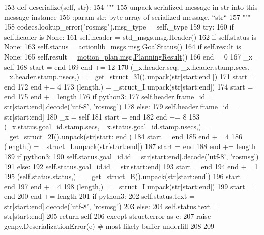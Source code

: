 \begin{DoxyCode}
153   \textcolor{keyword}{def }deserialize(self, str):
154     \textcolor{stringliteral}{"""}
155 \textcolor{stringliteral}{    unpack serialized message in str into this message instance}
156 \textcolor{stringliteral}{    :param str: byte array of serialized message, ``str``}
157 \textcolor{stringliteral}{    """}
158     codecs.lookup\_error(\textcolor{stringliteral}{"rosmsg"}).msg\_type = self.\_type
159     \textcolor{keywordflow}{try}:
160       \textcolor{keywordflow}{if} self.header \textcolor{keywordflow}{is} \textcolor{keywordtype}{None}:
161         self.header = std\_msgs.msg.Header()
162       \textcolor{keywordflow}{if} self.status \textcolor{keywordflow}{is} \textcolor{keywordtype}{None}:
163         self.status = actionlib\_msgs.msg.GoalStatus()
164       \textcolor{keywordflow}{if} self.result \textcolor{keywordflow}{is} \textcolor{keywordtype}{None}:
165         self.result = \hyperlink{classmotion__plan_1_1msg_1_1__PlanningResult_1_1PlanningResult}{motion\_plan.msg.PlanningResult}()
166       end = 0
167       \_x = self
168       start = end
169       end += 12
170       (\_x.header.seq, \_x.header.stamp.secs, \_x.header.stamp.nsecs,) = \_get\_struct\_3I().unpack(str[start:end
      ])
171       start = end
172       end += 4
173       (length,) = \_struct\_I.unpack(str[start:end])
174       start = end
175       end += length
176       \textcolor{keywordflow}{if} python3:
177         self.header.frame\_id = str[start:end].decode(\textcolor{stringliteral}{'utf-8'}, \textcolor{stringliteral}{'rosmsg'})
178       \textcolor{keywordflow}{else}:
179         self.header.frame\_id = str[start:end]
180       \_x = self
181       start = end
182       end += 8
183       (\_x.status.goal\_id.stamp.secs, \_x.status.goal\_id.stamp.nsecs,) = \_get\_struct\_2I().unpack(str[start:
      end])
184       start = end
185       end += 4
186       (length,) = \_struct\_I.unpack(str[start:end])
187       start = end
188       end += length
189       \textcolor{keywordflow}{if} python3:
190         self.status.goal\_id.id = str[start:end].decode(\textcolor{stringliteral}{'utf-8'}, \textcolor{stringliteral}{'rosmsg'})
191       \textcolor{keywordflow}{else}:
192         self.status.goal\_id.id = str[start:end]
193       start = end
194       end += 1
195       (self.status.status,) = \_get\_struct\_B().unpack(str[start:end])
196       start = end
197       end += 4
198       (length,) = \_struct\_I.unpack(str[start:end])
199       start = end
200       end += length
201       \textcolor{keywordflow}{if} python3:
202         self.status.text = str[start:end].decode(\textcolor{stringliteral}{'utf-8'}, \textcolor{stringliteral}{'rosmsg'})
203       \textcolor{keywordflow}{else}:
204         self.status.text = str[start:end]
205       \textcolor{keywordflow}{return} self
206     \textcolor{keywordflow}{except} struct.error \textcolor{keyword}{as} e:
207       \textcolor{keywordflow}{raise} genpy.DeserializationError(e)  \textcolor{comment}{# most likely buffer underfill}
208 
209 
\end{DoxyCode}
